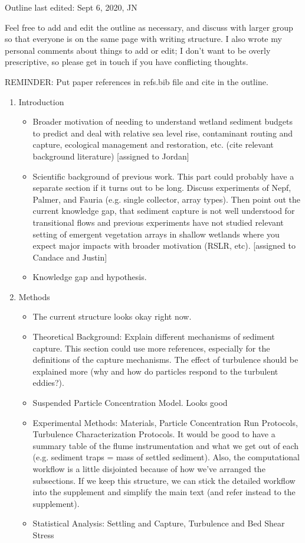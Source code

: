 Outline last edited: Sept 6, 2020, JN

Feel free to add and edit the outline as necessary, and discuss with larger group so that everyone is on the same page with writing structure. I also wrote my personal comments about things to add or edit; I don't want to be overly prescriptive, so please get in touch if you have conflicting thoughts.

REMINDER: Put paper references in refs.bib file and cite in the outline.

\begin{enumerate}
    \item Introduction
    \begin{itemize}
        \item Broader motivation of needing to understand wetland sediment budgets to predict and deal with relative sea level rise, contaminant routing and capture, ecological management and restoration, etc. (cite relevant background literature) [assigned to Jordan]
        \item Scientific background of previous work. This part could probably have a separate section if it turns out to be long. Discuss experiments of Nepf, Palmer, and Fauria (e.g. single collector, array types). Then point out the current knowledge gap, that sediment capture is not well understood for transitional flows and previous experiments have not studied relevant setting of emergent vegetation arrays in shallow wetlands where you expect major impacts with broader motivation (RSLR, etc). [assigned to Candace and Justin]
        \item Knowledge gap and hypothesis.
    \end{itemize}
    
    \item Methods
    \begin{itemize}
        \item The current structure looks okay right now.
        \item Theoretical Background: Explain different mechanisms of sediment capture. This section could use more references, especially for the definitions of the capture mechanisms. The effect of turbulence should be explained more (why and how do particles respond to the turbulent eddies?).
        \item Suspended Particle Concentration Model. Looks good
        \item Experimental Methods: Materials, Particle Concentration Run Protocols, Turbulence Characterization Protocols. It would be good to have a summary table of the flume instrumentation and what we get out of each (e.g. sediment traps = mass of settled sediment). Also, the computational workflow is a little disjointed because of how we've arranged the subsections. If we keep this structure, we can stick the detailed workflow into the supplement and simplify the main text (and refer instead to the supplement).
        \item Statistical Analysis: Settling and Capture, Turbulence and Bed Shear Stress
    \end{itemize}
    

\end{enumerate}

